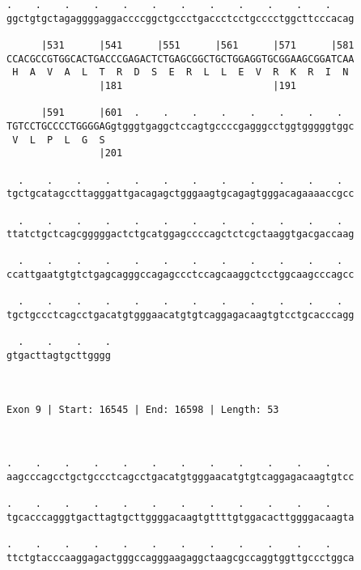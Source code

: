 \documentclass{article}
\begin{document}
\begin{Verbatim}
.    .    .    .    .    .    .    .    .    .    .    .    
ggctgtgctagaggggaggaccccggctgccctgaccctcctgcccctggcttcccacag
                                                            
      |531      |541      |551      |561      |571      |581
CCACGCCGTGGCACTGACCCGAGACTCTGAGCGGCTGCTGGAGGTGCGGAAGCGGATCAA
 H  A  V  A  L  T  R  D  S  E  R  L  L  E  V  R  K  R  I  N 
                |181                          |191          
  
      |591      |601  .    .    .    .    .    .    .    .  
TGTCCTGCCCCTGGGGAGgtgggtgaggctccagtgccccgagggcctggtgggggtggc
 V  L  P  L  G  S                                           
                |201                                        
  
  .    .    .    .    .    .    .    .    .    .    .    .  
tgctgcatagccttagggattgacagagctgggaagtgcagagtgggacagaaaaccgcc
                                                            
  .    .    .    .    .    .    .    .    .    .    .    .  
ttatctgctcagcgggggactctgcatggagccccagctctcgctaaggtgacgaccaag
                                                            
  .    .    .    .    .    .    .    .    .    .    .    .  
ccattgaatgtgtctgagcagggccagagccctccagcaaggctcctggcaagcccagcc
                                                            
  .    .    .    .    .    .    .    .    .    .    .    .  
tgctgccctcagcctgacatgtgggaacatgtgtcaggagacaagtgtcctgcacccagg
                                                            
  .    .    .    .
gtgacttagtgcttgggg
                  
                  
 
Exon 9 | Start: 16545 | End: 16598 | Length: 53



.    .    .    .    .    .    .    .    .    .    .    .    
aagcccagcctgctgccctcagcctgacatgtgggaacatgtgtcaggagacaagtgtcc
                                                            
.    .    .    .    .    .    .    .    .    .    .    .    
tgcacccagggtgacttagtgcttggggacaagtgttttgtggacacttggggacaagta
                                                            
.    .    .    .    .    .    .    .    .    .    .    .    
ttctgtacccaaggagactgggccagggaagaggctaagcgccaggtggttgccctggca
                                                            

\end{Verbatim}
\end{document}
